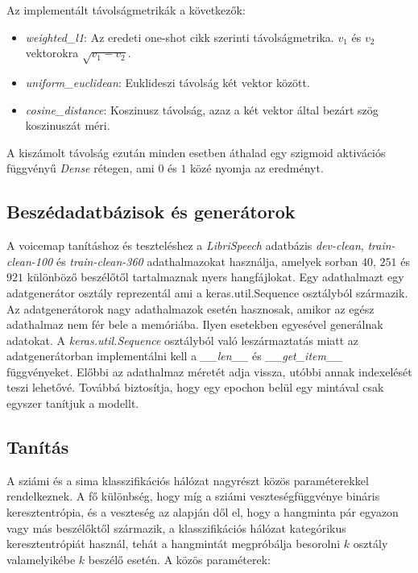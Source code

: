 Az implementált távolságmetrikák a következők:

\begin{itemize}
	\item \emph{weighted\_l1}: Az eredeti one-shot cikk szerinti távolságmetrika. $v_1$ és $v_2$ vektorokra $\sqrt{v_1-v_2}$.
	\item \emph{uniform\_euclidean}: Euklideszi távolság két vektor között.
	\item \emph{cosine\_distance}: Koszinusz távolság, azaz a két vektor által bezárt szög koszinuszát méri.
\end{itemize}

A kiszámolt távolság ezután minden esetben áthalad egy szigmoid aktivációs függvényű \emph{Dense} rétegen, ami $0$ és $1$ közé nyomja az eredményt.

\subsection{Beszédadatbázisok és generátorok}

A voicemap tanításhoz és teszteléshez a \emph{LibriSpeech} adatbázis \emph{dev-clean}, \emph{train-clean-100} és \emph{train-clean-360} adathalmazokat használja, amelyek sorban $40$, $251$ és $921$ különböző beszélőtől tartalmaznak nyers hangfájlokat.
\newline
\newline
Egy adathalmazt egy adatgenerátor osztály reprezentál ami a keras.util.Sequence osztályból származik. Az adatgenerátorok nagy adathalmazok esetén hasznosak, amikor az egész adathalmaz nem fér bele a memóriába. Ilyen esetekben egyesével generálnak adatokat.
\newline
\newline
A \emph{keras.util.Sequence} osztályból való leszármaztatás miatt az adatgenerátorban implementálni kell a \emph{\_\_len\_\_} és \emph{\_\_get\_item\_\_} függvényeket. Előbbi az adathalmaz méretét adja vissza, utóbbi annak indexelését teszi lehetővé. Továbbá biztosítja, hogy egy epochon belül egy mintával csak egyszer tanítjuk a modellt.

\subsection{Tanítás}

A sziámi és a sima klasszifikációs hálózat nagyrészt közös paraméterekkel rendelkeznek. A fő különbség, hogy míg a sziámi veszteségfüggvénye bináris keresztentrópia, és a veszteség az alapján dől el, hogy a hangminta pár egyazon vagy más beszélőktől származik, a klasszifikációs hálózat kategórikus keresztentrópiát használ, tehát a hangmintát megpróbálja besorolni $k$ osztály valamelyikébe $k$ beszélő esetén. A közös paraméterek:

